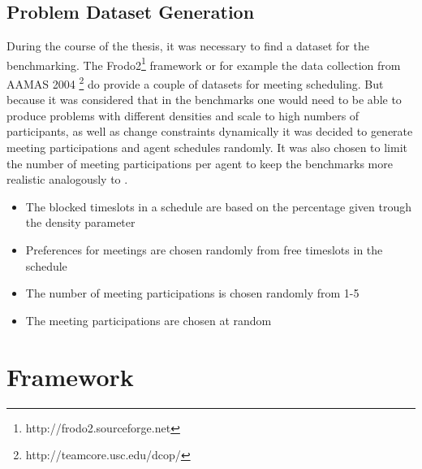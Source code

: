 \subsection{Problem Dataset Generation}

During the course of the thesis, it was necessary to find a dataset for the benchmarking. The Frodo2\footnote{http://frodo2.sourceforge.net} framework or for example the data collection from AAMAS 2004 \footnote{http://teamcore.usc.edu/dcop/} do provide a couple of datasets for meeting scheduling. But because it was considered that in the benchmarks one would need to be able to produce problems with different densities and scale to high numbers of participants, as well as change constraints dynamically it was decided to generate meeting participations and agent schedules randomly. It was also chosen to limit the number of meeting participations per agent to keep the benchmarks more realistic analogously to \cite{Chun2003}.

\begin{itemize}
\item The blocked timeslots in a schedule are based on the percentage given trough the density parameter
\item Preferences for meetings are chosen randomly from free timeslots in the schedule
\item The number of meeting participations is chosen randomly from 1-5
\item The meeting participations are chosen at random
\end{itemize}

\section{Framework}

